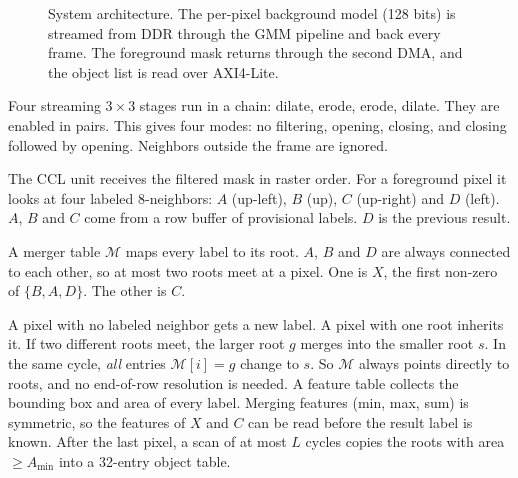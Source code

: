 \documentclass[conference]{IEEEtran}
\begin{document}
\begin{figure}[!t]
{}
\caption{System architecture. The per-pixel background model (128 bits) is
streamed from DDR through the GMM pipeline and back every frame. The
foreground mask returns through the second DMA, and the object list is read
over AXI4-Lite.}
\label{fig:system}
\end{figure}
Four streaming $3\times3$ stages run in a chain: dilate, erode, erode, dilate.
They are enabled in pairs. This gives four modes: no filtering, opening,
closing, and closing followed by opening. Neighbors outside the frame are
ignored.

The CCL unit receives the filtered mask in raster order. For a foreground pixel
it looks at four labeled 8-neighbors: $A$ (up-left), $B$ (up), $C$ (up-right)
and $D$ (left). $A$, $B$ and $C$ come from a row buffer of provisional labels.
$D$ is the previous result.

A merger table $\mathcal{M}$ maps every label to its root. $A$, $B$ and $D$ are
always connected to each other, so at most two roots meet at a pixel. One is
$X$, the first non-zero of $\{B,A,D\}$. The other is $C$.

A pixel with no labeled neighbor gets a new label. A pixel with one root
inherits it. If two different roots meet, the larger root $g$ merges into the
smaller root $s$. In the same cycle, \emph{all} entries $\mathcal{M}[i]=g$
change to $s$. So $\mathcal{M}$ always points directly to roots, and no
end-of-row resolution is needed. A feature table collects the bounding box and area of every label. Merging
features (min, max, sum) is symmetric, so the features of $X$ and $C$ can be
read before the result label is known. After the last pixel, a scan of at most
$L$ cycles copies the roots with area $\ge A_{\min}$ into a 32-entry object
table.
\end{document}
